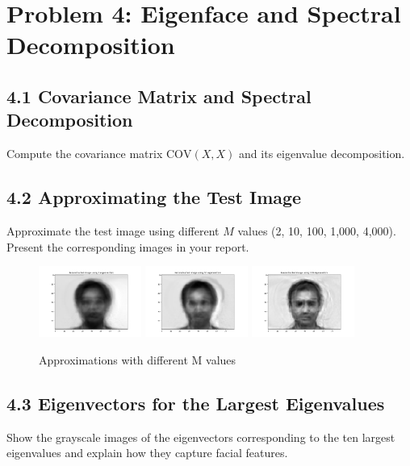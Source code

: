 \documentclass[12pt]{article}
\begin{document}
\section*{Problem 4: Eigenface and Spectral Decomposition}

\subsection*{4.1 Covariance Matrix and Spectral Decomposition}
Compute the covariance matrix \( \text{COV}(X, X) \) and its eigenvalue decomposition.

\subsection*{4.2 Approximating the Test Image}
Approximate the test image using different \( M \) values (2, 10, 100, 1,000, 4,000). Present the corresponding images in your report.

\begin{figure}[H]
    \centering
    \includegraphics[width=0.3\textwidth]{eigenface_M2.png}
    \includegraphics[width=0.3\textwidth]{eigenface_M10.png}
    \includegraphics[width=0.3\textwidth]{eigenface_M100.png}
    \caption{Approximations with different M values}
\end{figure}

\subsection*{4.3 Eigenvectors for the Largest Eigenvalues}
Show the grayscale images of the eigenvectors corresponding to the ten largest eigenvalues and explain how they capture facial features.
\end{document}
